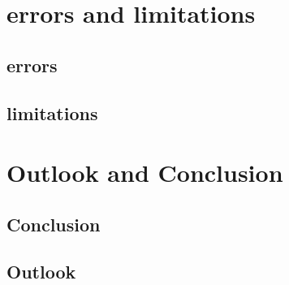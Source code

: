 \documentclass[../thesis.tex]{subfiles}
\begin{document}
\chapter{errors and limitations}
\label{chp:err_lims}

\section{errors}

\section{limitations}

\chapter{Outlook and Conclusion}
\label{chp:out_con}
\section{Conclusion}

\section{Outlook}
\end{document}
